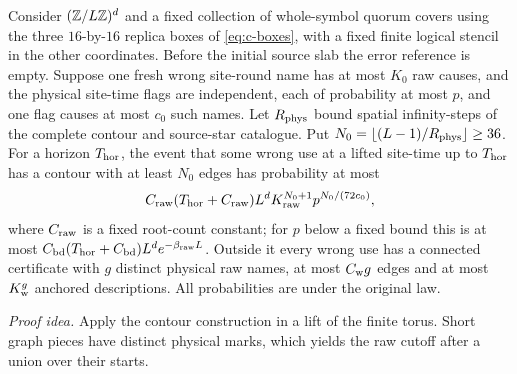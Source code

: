 \begin{lemma}\label{f4:raw}
Consider \((\mathbb Z/L\mathbb Z)^d\) and a fixed collection of whole-symbol quorum covers using the
three \(16\)-by-\(16\) replica boxes of \eqref{eq:c-boxes}, with a
fixed finite logical stencil in the other coordinates. Before the
initial source slab the error reference is empty. Suppose one fresh
wrong site-round name has at most \(K_0\) raw causes, and the physical
site-time flags are independent, each of probability at most \(p\), and
one flag causes at most \(c_0\) such names.
Let \(R_{\rm phys}\) bound spatial infinity-steps of the complete
contour and source-star catalogue. Put
\(N_0=\lfloor(L-1)/R_{\rm phys}\rfloor\ge36\).
For a horizon \(T_{\rm hor}\), the event that some wrong use at a lifted
site-time up to \(T_{\rm hor}\) has a contour with at least \(N_0\) edges
has probability at most
\[
 C_{\rm raw}(T_{\rm hor}+C_{\rm raw})L^d
 K_{\rm raw}^{N_0+1}p^{N_0/(72c_0)},
\]
where \(C_{\rm raw}\) is a fixed root-count constant; for \(p\) below a
fixed bound this is at most
\(C_{\rm bd}(T_{\rm hor}+C_{\rm bd})L^de^{-\beta_{\rm raw}L}\).
Outside it every wrong use has a connected certificate with \(g\)
distinct physical raw names, at most \(C_{\rm w}g\) edges and at most
\(K_{\rm w}^g\) anchored descriptions. All probabilities are under
the original law.
\end{lemma}
\par\noindent\emph{Proof idea.} Apply the contour construction in a lift of the finite torus. Short graph pieces have distinct physical marks, which yields the raw cutoff after a union over their starts.

